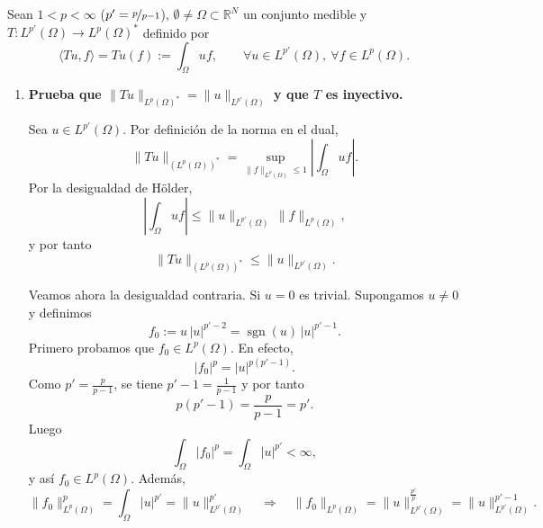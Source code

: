 \documentclass[12pt]{article}
\begin{document}
    \newpage
    \begin{ejercicio}[4 puntos]
        Sean $1<p<\infty$ ($p'=\nicefrac{p}{p-1}$), $\emptyset\neq\Omega\subset\mathbb{R}^N$ un conjunto medible y
        $T:L^{p'}(\Omega)\to L^p(\Omega)^\ast$ definido por
        \begin{equation*}
        \langle Tu,f\rangle = Tu(f):= \int_\Omega u f,
        \qquad
        \forall u\in L^{p'}(\Omega),\ \forall f\in L^p(\Omega).
        \end{equation*}
        
        \begin{enumerate}[label=\alph*)]
        
        \item \textbf{Prueba que $\|Tu\|_{L^p(\Omega)^\ast}=\|u\|_{L^{p'}(\Omega)}$ y que $T$ es inyectivo.}
        
        Sea $u\in L^{p'}(\Omega)$. Por definición de la norma en el dual,
        \begin{equation*}
        \|Tu\|_{(L^p(\Omega))^\ast}
        =
        \sup_{\|f\|_{L^p(\Omega)}\le 1}
        \left|\int_\Omega u f\right|.
        \end{equation*}
        Por la desigualdad de Hölder,
        \begin{equation*}
        \left|\int_\Omega u f\right|
        \le
        \|u\|_{L^{p'}(\Omega)}\,\|f\|_{L^p(\Omega)},
        \end{equation*}
        y por tanto
        \begin{equation*}
        \|Tu\|_{(L^p(\Omega))^\ast}\le \|u\|_{L^{p'}(\Omega)}.
        \end{equation*}
        
        Veamos ahora la desigualdad contraria. Si $u=0$ es trivial. Supongamos $u\neq 0$ y definimos
        \begin{equation*}
        f_0:=u\,|u|^{p'-2}=\operatorname{sgn}(u)\,|u|^{p'-1}.
        \end{equation*}
        Primero probamos que $f_0\in L^p(\Omega)$. En efecto,
        \begin{equation*}
        |f_0|^p = |u|^{p(p'-1)}.
        \end{equation*}
        Como $p'=\frac{p}{p-1}$, se tiene $p'-1=\frac{1}{p-1}$ y por tanto
        \begin{equation*}
        p(p'-1)=\frac{p}{p-1}=p'.
        \end{equation*}
        Luego
        \begin{equation*}
        \int_\Omega |f_0|^p=\int_\Omega |u|^{p'}<\infty,
        \end{equation*}
        y así $f_0\in L^p(\Omega)$. Además,
        \begin{equation*}
        \|f_0\|_{L^p(\Omega)}^p=\int_\Omega |u|^{p'}=\|u\|_{L^{p'}(\Omega)}^{p'}
        \quad\Longrightarrow\quad
        \|f_0\|_{L^p(\Omega)}=\|u\|_{L^{p'}(\Omega)}^{\frac{p'}{p}}
        =\|u\|_{L^{p'}(\Omega)}^{p'-1}.
        \end{equation*}
        

\end{enumerate}
\end{ejercicio}
\end{document}
